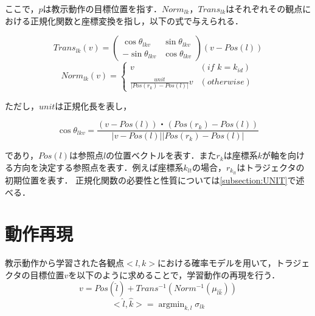 ここで，$p$は教示動作の目標位置を指す．$Norm_{lk}$，$Trans_{lk}$はそれぞれその観点における正規化関数と座標変換を指し，以下の式で与えられる．

\begin{equation}
	Trans_{lk}(v) = 
	\begin{pmatrix}
        	\cos θ_{lkv} & \sin θ_{lkv} \\
        	-\sin θ_{lkv} & \cos θ_{lkv}
	\end{pmatrix}
	(v-Pos(l))
\end{equation}
\begin{equation}
	\label{equation:Norm}
	Norm_{lk}(v) = 
	\begin{cases}
		v & (if\,\,k=k_{id}) \\
		\frac{unit}{| Pos(r_{k})-Pos(l) |}v & (otherwise)
	\end{cases}
\end{equation}

ただし，$unit$は正規化長を表し，

\[
	\cos θ_{lkv} = \frac{(v-Pos(l))・(Pos(r_{k})-Pos(l))}{| v-Pos(l) || Pos(r_{k})-Pos(l) |}
\]

であり，$Pos(l)$は参照点$l$の位置ベクトルを表す．また$r_{k}$は座標系$k$が軸を向ける方向を決定する参照点を表す．例えば座標系$k_{lt}$の場合，$r_{k_{lt}}$はトラジェクタの初期位置を表す．
正規化関数の必要性と性質については\ref{subsection:UNIT}で述べる．

\section{動作再現}

教示動作から学習された各観点$<l , k>$における確率モデルを用いて，トラジェクタの目標位置$v$を以下のように求めることで，学習動作の再現を行う．
\begin{equation}
	v =  Pos(\hat{l}) +Trans^{-1}(Norm^{-1}(μ_{\hat{l}\hat{k}})) 
\end{equation}
\begin{equation}
	<\hat{l} , \hat{k}> =  \mathop{\arg\min}_{k , l}σ_{lk}
\end{equation}

